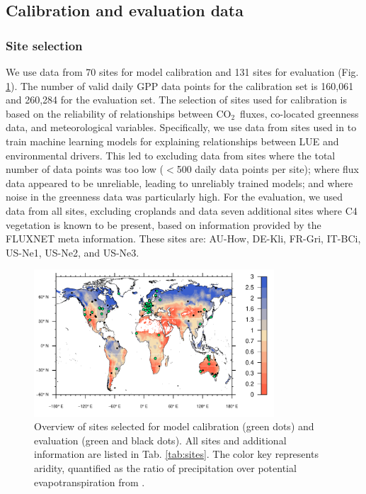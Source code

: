 \documentclass{myreport}
\newcommand{\coo}{CO$_2$}
\begin{document}
\subsection{Calibration and evaluation data}

\subsubsection{Site selection}
We use data from 70 sites for model calibration and 131 sites for evaluation (Fig. \ref{fig:map_sites}). The number of valid daily GPP data points for the calibration set is 160,061 and 260,284 for the evaluation set. The selection of sites used for calibration is based on the reliability of relationships between \coo\ fluxes, co-located greenness data, and meteorological variables. Specifically, we use data from sites used in \cite{stocker18newphyt} to train machine learning models for explaining relationships between LUE and environmental drivers. This led to excluding data from sites where the total number of data points was too low ($<$500 daily data points per site); where flux data appeared to be unreliable, leading to unreliably trained models; and where noise in the greenness data was particularly high. For the evaluation, we used data from all sites, excluding croplands and data seven additional sites where C4 vegetation is known to be present, based on information provided by the FLUXNET meta information. These sites are: AU-How, DE-Kli, FR-Gri, IT-BCi, US-Ne1, US-Ne2, and US-Ne3.

\begin{figure}[!ht]
    \centering
    \includegraphics[width=0.8\textwidth]{fig/map_sites.pdf}
    \caption{Overview of sites selected for model calibration (green dots) and evaluation (green and black dots). All sites and additional information are listed in Tab. \ref{tab:sites}. The color key represents aridity, quantified as the ratio of precipitation over potential evapotranspiration from \cite{greve14}.}
    \label{fig:map_sites}
\end{figure}
\end{document}
